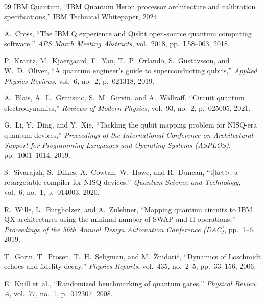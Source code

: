 \documentclass[10pt,twocolumn]{article}
\begin{document}
\begin{thebibliography}{99}
IBM Quantum,
``IBM Quantum Heron processor architecture and calibration specifications,''
IBM Technical Whitepaper, 2024.

A.~Cross,
``The IBM Q experience and Qiskit open-source quantum computing software,''
\emph{APS March Meeting Abstracts}, vol.~2018, pp.~L58--003, 2018.

P.~Krantz, M.~Kjaergaard, F.~Yan, T.~P.~Orlando, S.~Gustavsson, and W.~D.~Oliver,
``A quantum engineer's guide to superconducting qubits,''
\emph{Applied Physics Reviews}, vol.~6, no.~2, p.~021318, 2019.

A.~Blais, A.~L.~Grimsmo, S.~M.~Girvin, and A.~Wallraff,
``Circuit quantum electrodynamics,''
\emph{Reviews of Modern Physics}, vol.~93, no.~2, p.~025005, 2021.

G.~Li, Y.~Ding, and Y.~Xie,
``Tackling the qubit mapping problem for NISQ-era quantum devices,''
\emph{Proceedings of the International Conference on Architectural Support for Programming Languages and Operating Systems (ASPLOS)}, pp.~1001--1014, 2019.

S.~Sivarajah, S.~Dilkes, A.~Cowtan, W.~Howe, and R.~Duncan,
``t|ket>: a retargetable compiler for NISQ devices,''
\emph{Quantum Science and Technology}, vol.~6, no.~1, p.~014003, 2020.

R.~Wille, L.~Burgholzer, and A.~Zulehner,
``Mapping quantum circuits to IBM QX architectures using the minimal number of SWAP and H operations,''
\emph{Proceedings of the 56th Annual Design Automation Conference (DAC)}, pp.~1--6, 2019.

T.~Gorin, T.~Prosen, T.~H.~Seligman, and M.~\v{Z}nidari\v{c},
``Dynamics of Loschmidt echoes and fidelity decay,''
\emph{Physics Reports}, vol.~435, no.~2--5, pp.~33--156, 2006.

E.~Knill et~al.,
``Randomized benchmarking of quantum gates,''
\emph{Physical Review A}, vol.~77, no.~1, p.~012307, 2008.
\end{thebibliography}
\end{document}
